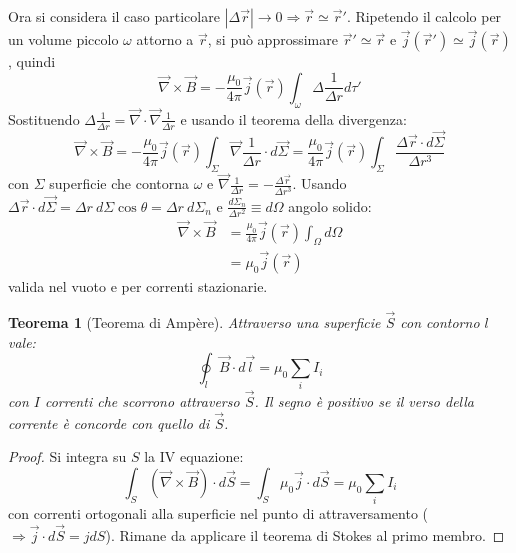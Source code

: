 \documentclass[10pt, a4paper]{scrartcl}
\numberwithin{equation}{subsection}
\theoremstyle{style1}
\newtheorem{teorema}{Teorema}[section]
\newenvironment{boxenv}[1][]{
    \begin{eqbox}[#1]
    }{
   \end{eqbox}
}
\begin{document}
Ora si considera il caso particolare $|\Delta \vec{r}| \to 0 \Rightarrow \vec{r} \simeq \vec{r}'$. Ripetendo il calcolo per un volume piccolo $\omega$ attorno a $\vec{r}$, si pu\`o approssimare $\vec{r}' \simeq \vec{r}$ e $\vec{j}(\vec{r}') \simeq \vec{j}(\vec{r})$, quindi
\begin{equation}
	\vec{\nabla }\times \vec{B} = -\frac{\mu_0}{4\pi}\vec{j}(\vec{r}) \int_{\omega} \Delta  \frac{1}{\Delta  r} d\tau '
\end{equation}
Sostituendo $\Delta \frac{1}{\Delta r} = \vec{\nabla }\cdot \vec{\nabla }\frac{1}{\Delta r}$ e usando il teorema della divergenza:
\begin{equation}
	\vec{\nabla }\times \vec{B} =- \frac{\mu_0}{4\pi} \vec{j}(\vec{r}) \int_{\Sigma} \vec{\nabla }\frac{1}{\Delta r} \cdot d\vec{\Sigma} =\frac{\mu_0}{4\pi} \vec{j}(\vec{r}) \int_{\Sigma} \frac{\Delta \vec{r}\cdot d\vec{\Sigma}}{\Delta r^3}
\end{equation}
con $\Sigma$ superficie che contorna $\omega$ e $\vec{\nabla }\frac{1}{\Delta r} = - \frac{\Delta \vec{r}}{\Delta r^3}$. Usando $\Delta \vec{r}\cdot d\vec{\Sigma}= \Delta r\ d\Sigma \cos \theta  = \Delta r\ d\Sigma_n$ e $\frac{d\Sigma_n}{\Delta r^2}\equiv d\Omega $ angolo solido:
\begin{equation}
	\begin{split}
		\vec{\nabla }\times \vec{B} &= \frac{\mu_0}{4\pi} \vec{j}(\vec{r}) \int_{\Omega } d\Omega \\
					    & = \mu_0 \vec{j}(\vec{r})
	\end{split}
\end{equation}
valida nel vuoto e per correnti stazionarie.
\begin{teorema}
	[Teorema di Amp\`ere]
Attraverso una superficie $\vec{S}$ con contorno $l$ vale:
\begin{equation}
	\oint_{l} \vec{B}\cdot d\vec{l} = \mu_0	\sum_{i}^{} I_i
\end{equation}
con $I$ correnti che scorrono attraverso $\vec{S}$. Il segno \`e positivo se il verso della corrente \`e concorde con quello di $\vec{S}$.
\end{teorema}
\begin{boxenv}[]
\begin{proof}
	Si integra su $S$ la IV equazione:
	\begin{equation}
		\int_{S} (\vec{\nabla }\times \vec{B}) \cdot d\vec{S} = \int_{S}  \mu_0 \vec{j}\cdot d\vec{S} = \mu_0 \sum_{i}^{} I_i
	\end{equation}
	con correnti ortogonali alla superficie nel punto di attraversamento ($\Rightarrow \vec{j}\cdot d\vec{S} = j dS$). Rimane da applicare il teorema di Stokes al primo membro.
\end{proof}
\end{boxenv}
\end{document}
